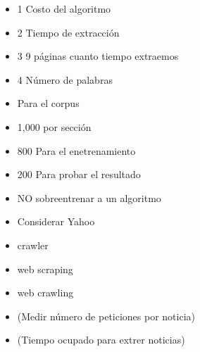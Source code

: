 \begin{itemize}

	\item 1 Costo del algoritmo
	\item 2 Tiempo de extracción
	\item 3 9 páginas cuanto tiempo extraemos
	\item 4 Número de palabras



	\item Para el corpus 
	\item 	1,000 por sección
	\item 		800 Para el enetrenamiento
	\item 		200 Para probar el resultado

	\item NO sobreentrenar a un algoritmo

	\item Considerar Yahoo



	\item crawler
	\item web scraping
	\item web crawling

	\item (Medir número de peticiones por noticia)
	\item (Tiempo ocupado para extrer noticias)

\end{itemize}

